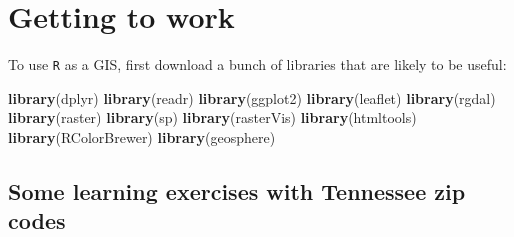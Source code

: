 \documentclass[]{book}
\newenvironment{Shaded}{\begin{snugshade}}{\end{snugshade}}
\newcommand{\ControlFlowTok}[1]{\textcolor[rgb]{0.13,0.29,0.53}{\textbf{#1}}}
\newcommand{\KeywordTok}[1]{\textcolor[rgb]{0.13,0.29,0.53}{\textbf{#1}}}
\newcommand{\NormalTok}[1]{#1}
\newcommand{\OperatorTok}[1]{\textcolor[rgb]{0.81,0.36,0.00}{\textbf{#1}}}
\newcommand{\StringTok}[1]{\textcolor[rgb]{0.31,0.60,0.02}{#1}}
\begin{document}
\hypertarget{getting-to-work}{%
\section*{Getting to work}\label{getting-to-work}}

To use \texttt{R} as a GIS, first download a bunch of libraries that are likely to be useful:

\begin{Shaded}
\end{Shaded}

\begin{Shaded}
\begin{Highlighting}[]
\KeywordTok{library}\NormalTok{(dplyr)}
\KeywordTok{library}\NormalTok{(readr)}
\KeywordTok{library}\NormalTok{(ggplot2)}
\KeywordTok{library}\NormalTok{(leaflet)}
\KeywordTok{library}\NormalTok{(rgdal)}
\KeywordTok{library}\NormalTok{(raster)}
\KeywordTok{library}\NormalTok{(sp)}
\KeywordTok{library}\NormalTok{(rasterVis)}
\KeywordTok{library}\NormalTok{(htmltools)}
\KeywordTok{library}\NormalTok{(RColorBrewer)}
\KeywordTok{library}\NormalTok{(geosphere)}
\end{Highlighting}
\end{Shaded}

\hypertarget{some-learning-exercises-with-tennessee-zip-codes}{%
\subsection*{Some learning exercises with Tennessee zip codes}\label{some-learning-exercises-with-tennessee-zip-codes}}
\end{document}
